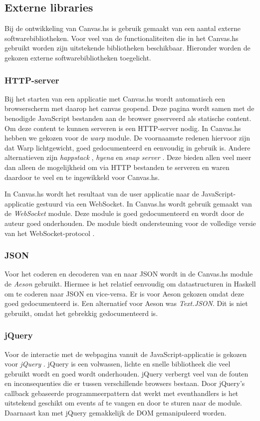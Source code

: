 \subsection{Externe libraries}
\label{subsec:externe_libraries}
Bij de ontwikkeling van Canvas.hs is gebruik gemaakt van een aantal externe softwarebibliotheken. Voor veel van de functionaliteiten die in het Canvas.hs gebruikt worden zijn uitstekende bibliotheken beschikbaar. Hieronder worden de gekozen externe softwarebibliotheken toegelicht.

\subsubsection{HTTP-server}
Bij het starten van een applicatie met Canvas.hs wordt automatisch een browserscherm met daarop het canvas geopend. Deze pagina wordt samen met de benodigde JavaScript bestanden aan de browser geserveerd als statische content. Om deze content te kunnen serveren is een HTTP-server nodig. In Canvas.hs hebben we gekozen voor de \emph{warp} \cite{Warp} module. De voornaamste redenen hiervoor zijn dat Warp lichtgewicht, goed gedocumenteerd en eenvoudig in gebruik is. Andere alternatieven zijn \emph{happstack} \cite{Happstack}, \emph{hyena} \cite{Hyena} en \emph{snap server} \cite{SnapServer}. Deze bieden allen veel meer dan alleen de mogelijkheid om via HTTP bestanden te serveren en waren daardoor te veel en te ingewikkeld voor Canvas.hs.

In Canvas.hs wordt het resultaat van de user applicatie naar de JavaScript-applicatie gestuurd via een WebSocket. In Canvas.hs wordt gebruik gemaakt van de \emph{WebSocket}  \cite{WebSocket} module. Deze module is goed gedocumenteerd en wordt door de auteur goed onderhouden. De module biedt ondersteuning voor de volledige versie van het WebSocket-protocol \cite{WebSocket2011}.  

\subsubsection{JSON}
Voor het coderen en decoderen van en naar JSON wordt in de Canvas.hs module de \emph{Aeson} \cite{Aeson} gebruikt. Hiermee is het relatief eenvoudig om datastructuren in Haskell om te coderen naar JSON en vice-versa. Er is voor Aeson gekozen omdat deze goed gedocumenteerd is. Een alternatief voor Aeson was \emph{Text.JSON}. Dit is niet gebruikt, omdat het gebrekkig gedocumenteerd is.

\subsubsection{jQuery}
Voor de interactie met de webpagina vanuit de JavaScript-applicatie is gekozen voor \emph{jQuery} \cite{jQuery}. jQuery is een volwassen, lichte en snelle bibliotheek die veel gebruikt wordt en goed wordt onderhouden. jQuery verbergt veel van de fouten en inconsequenties die er tussen verschillende browsers bestaan. Door jQuery's callback gebaseerde programmeerpattern dat werkt met eventhandlers is het uitstekend geschikt om events af te vangen en door te sturen naar de module. Daarnaast kan met jQuery gemakkelijk de DOM gemanipuleerd worden.

